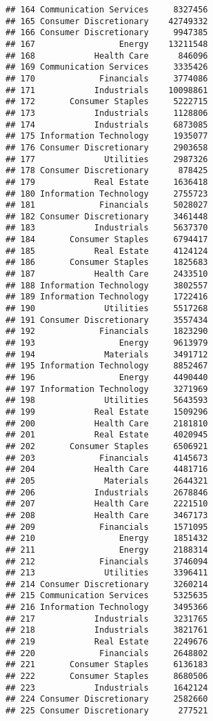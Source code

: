 \documentclass[
]{article}
\begin{document}
\begin{verbatim}
## 164 Communication Services     8327456
## 165 Consumer Discretionary    42749332
## 166 Consumer Discretionary     9947385
## 167                 Energy    13211548
## 168            Health Care      846096
## 169 Communication Services     3335426
## 170             Financials     3774086
## 171            Industrials    10098861
## 172       Consumer Staples     5222715
## 173            Industrials     1128806
## 174            Industrials     6873085
## 175 Information Technology     1935077
## 176 Consumer Discretionary     2903658
## 177              Utilities     2987326
## 178 Consumer Discretionary      878425
## 179            Real Estate     1636418
## 180 Information Technology     2755723
## 181             Financials     5028027
## 182 Consumer Discretionary     3461448
## 183            Industrials     5637370
## 184       Consumer Staples     6794417
## 185            Real Estate     4124124
## 186       Consumer Staples     1825683
## 187            Health Care     2433510
## 188 Information Technology     3802557
## 189 Information Technology     1722416
## 190              Utilities     5517268
## 191 Consumer Discretionary     3557434
## 192             Financials     1823290
## 193                 Energy     9613979
## 194              Materials     3491712
## 195 Information Technology     8852467
## 196                 Energy     4490440
## 197 Information Technology     3271969
## 198              Utilities     5643593
## 199            Real Estate     1509296
## 200            Health Care     2181810
## 201            Real Estate     4020945
## 202       Consumer Staples     6506921
## 203             Financials     4145673
## 204            Health Care     4481716
## 205              Materials     2644321
## 206            Industrials     2678846
## 207            Health Care     2221510
## 208            Health Care     3467173
## 209             Financials     1571095
## 210                 Energy     1851432
## 211                 Energy     2188314
## 212             Financials     3746094
## 213              Utilities     3396411
## 214 Consumer Discretionary     3260214
## 215 Communication Services     5325635
## 216 Information Technology     3495366
## 217            Industrials     3231765
## 218            Industrials     3821761
## 219            Real Estate     2249676
## 220             Financials     2648802
## 221       Consumer Staples     6136183
## 222       Consumer Staples     8680506
## 223            Industrials     1642124
## 224 Consumer Discretionary     2582660
## 225 Consumer Discretionary      277521

\end{verbatim}
\end{document}
